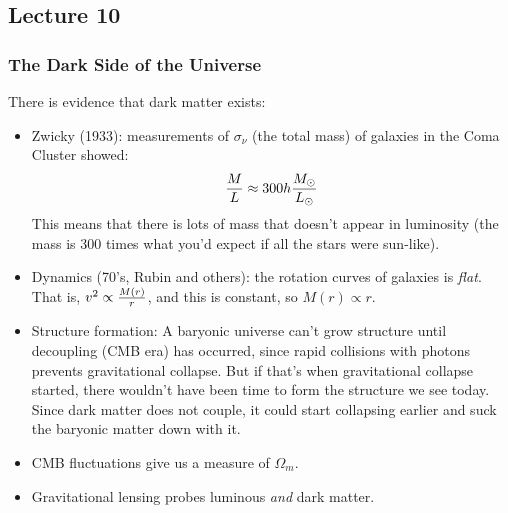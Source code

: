 \documentclass{article}
\begin{document}
\subsection{Lecture 10}

\subsubsection*{ The Dark Side of the Universe}

There is evidence that dark matter exists:
\begin{itemize}
\item Zwicky (1933): measurements of $\sigma_\nu$ (the total mass) of galaxies 
in the Coma Cluster showed:
$${M\over L}\approx300h{M_\odot\over L_\odot}$$
This means that there is lots of mass that doesn't appear in luminosity
(the mass is 300 times what you'd expect if all the stars were sun-like).
\item Dynamics (70's, Rubin and others): the rotation curves of galaxies
is {\it flat}.  That is, $v^2\propto{M(r)\over r}$, and this is constant,
so $M(r)\propto r$.
\item Structure formation: A baryonic universe can't grow structure
until decoupling (CMB era) has occurred, since rapid collisions with photons
prevents gravitational collapse.  But if that's when gravitational collapse
started, there wouldn't have been time to form the structure we see today.
Since dark matter does not couple, it could start collapsing earlier and suck 
the baryonic matter down with it. 
\item CMB fluctuations give us a measure of $\Omega_m$.
\item Gravitational lensing probes luminous {\it and} dark matter.
\end{itemize}
\end{document}
